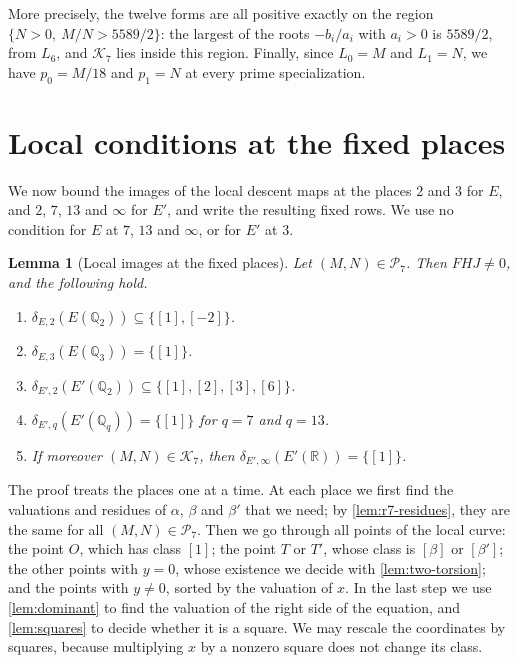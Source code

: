 \documentclass[12pt,oneside,openany]{book}
\theoremstyle{definition}
\theoremstyle{plain}
\numberwithin{equation}{chapter}
\theoremstyle{plain}
\newtheorem{lemma}[lemma]{Lemma}
\theoremstyle{definition}
\theoremstyle{remark}
\newcommand{\Q}{\mathbb Q}
\newcommand{\R}{\mathbb R}
\newcommand{\sq}[1]{[#1]}
\newcommand{\cP}{\mathcal P}
\newcommand{\cK}{\mathcal K}
\begin{document}
More precisely, the twelve forms are all positive exactly on the region
$\{N>0,\ M/N>5589/2\}$: the largest of the roots $-b_i/a_i$ with $a_i>0$ is
$5589/2$, from $L_6$, and $\cK_7$ lies inside this region. Finally, since
$L_0=M$ and $L_1=N$, we have $p_0=M/18$ and $p_1=N$ at every prime
specialization.

\section{Local conditions at the fixed places}\label{sec:r7-fixed}

We now bound the images of the local descent maps at the places $2$ and $3$ for $E$, and $2$, $7$, $13$ and $\infty$ for $E'$, and write the resulting fixed rows. We use no condition for $E$ at $7$, $13$ and
$\infty$, or for $E'$ at $3$.

\begin{lemma}[Local images at the fixed places]\label{lem:r7-fixed}
Let $(M,N)\in\cP_7$. Then $FHJ\ne0$, and the following hold.
\begin{enumerate}[label=(\alph*)]
\item\label{item:r7-E2} $\delta_{E,2}(E(\Q_2))\subseteq\{\sq1,\sq{-2}\}$.
\item\label{item:r7-E3} $\delta_{E,3}(E(\Q_3))=\{\sq1\}$.
\item\label{item:r7-Ep2} $\delta_{E',2}(E'(\Q_2))\subseteq\{\sq1,\sq2,\sq3,\sq6\}$.
\item\label{item:r7-Ep713} $\delta_{E',q}(E'(\Q_q))=\{\sq1\}$ for $q=7$ and $q=13$.
\item\label{item:r7-Epinf} If moreover $(M,N)\in\cK_7$, then
$\delta_{E',\infty}(E'(\R))=\{\sq1\}$.
\end{enumerate}
\end{lemma}

The proof treats the places one at a time. At each place we first find the
valuations and residues of $\alpha$, $\beta$ and $\beta'$ that we need; by
\cref{lem:r7-residues}, they are the same for all $(M,N)\in\cP_7$. Then we
go through all points of the local curve: the point $O$, which has class
$\sq1$; the point $T$ or $T'$, whose class is $\sq\beta$ or $\sq{\beta'}$;
the other points with $y=0$, whose existence we decide with
\cref{lem:two-torsion}; and the points with $y\ne0$, sorted by the
valuation of $x$. In the last step we use \cref{lem:dominant} to find the
valuation of the right side of the equation, and \cref{lem:squares} to
decide whether it is a square. We may rescale the coordinates by squares,
because multiplying $x$ by a nonzero square does not change its class.
\end{document}
